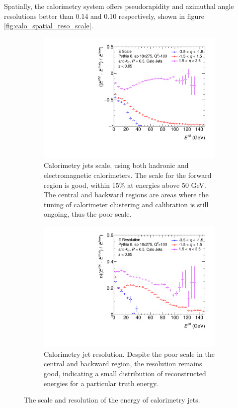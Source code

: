 Spatially, the calorimetry system offers pseudorapidity and azimuthal angle resolutions better than  0.14 and 0.10 respectively, shown in figure \ref{fig:calo_spatial_reso_scale}.   


\begin{figure}
    \centering
    \begin{subfigure}{0.4\textwidth}
        \centering
        \includegraphics[width=\linewidth]{figs/Final_Plots/JES_calo_grouped.pdf}
        \caption{Calorimetry jets scale, using both hadronic and electromagnetic calorimeters.  The scale for the forward region is good, within 15\% at energies above 50 GeV.  The central and backward regions are areas where the tuning of calorimeter clustering and calibration is still ongoing, thus the poor scale.}
        \label{fig:calo_energy_scale}
    \end{subfigure}
    \hfill
    \begin{subfigure}{0.4\textwidth}
        \centering
        \includegraphics[width=\linewidth]{figs/Final_Plots/JER_E_calo_grouped.pdf}
        \caption{Calorimetry jet resolution.  Despite the poor scale in the central and backward region, the resolution remains good, indicating a small distribution of reconstructed energies for a particular truth energy.}
        \label{fig:calo_energy_resolution}
    \end{subfigure}
    \caption{The scale and resolution of the energy of calorimetry jets.}
    \label{fig:calo_energy_reso_scale}
\end{figure}
